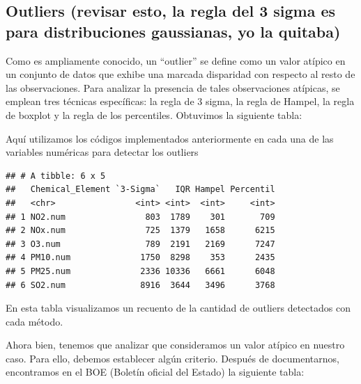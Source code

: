 \documentclass[notspecified,article,submit,moreauthors,pdftex]{Definitions/mdpi}
\begin{document}
\hypertarget{outliers-revisar-esto-la-regla-del-3-sigma-es-para-distribuciones-gaussianas-yo-la-quitaba}{%
\subsection{Outliers (revisar esto, la regla del 3 sigma es para
distribuciones gaussianas, yo la
quitaba)}\label{outliers-revisar-esto-la-regla-del-3-sigma-es-para-distribuciones-gaussianas-yo-la-quitaba}}

Como es ampliamente conocido, un ``outlier'' se define como un valor
atípico en un conjunto de datos que exhibe una marcada disparidad con
respecto al resto de las observaciones. Para analizar la presencia de
tales observaciones atípicas, se emplean tres técnicas específicas: la
regla de 3 sigma, la regla de Hampel, la regla de boxplot y la regla de
los percentiles. Obtuvimos la siguiente tabla:

Aquí utilizamos los códigos implementados anteriormente en cada una de
las variables numéricas para detectar los outliers

\begin{verbatim}
## # A tibble: 6 x 5
##   Chemical_Element `3-Sigma`   IQR Hampel Percentil
##   <chr>                <int> <int>  <int>     <int>
## 1 NO2.num                803  1789    301       709
## 2 NOx.num                725  1379   1658      6215
## 3 O3.num                 789  2191   2169      7247
## 4 PM10.num              1750  8298    353      2435
## 5 PM25.num              2336 10336   6661      6048
## 6 SO2.num               8916  3644   3496      3768
\end{verbatim}

En esta tabla visualizamos un recuento de la cantidad de outliers
detectados con cada método.

Ahora bien, tenemos que analizar que consideramos un valor atípico en
nuestro caso. Para ello, debemos establecer algún criterio. Después de
documentarnos, encontramos en el BOE (Boletín oficial del Estado) la
siguiente tabla:
\end{document}
